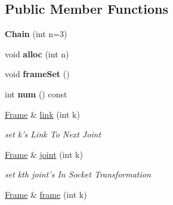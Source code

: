 \subsection*{Public Member Functions}
\begin{DoxyCompactItemize}
\item 
\hypertarget{classvsr_1_1_chain_a83b1b055fd89696f07791827a9e92c41}{{\bfseries Chain} (int n=3)}\label{classvsr_1_1_chain_a83b1b055fd89696f07791827a9e92c41}

\item 
\hypertarget{classvsr_1_1_chain_a8cbac59a79882160bb1833b0fcc94450}{void {\bfseries alloc} (int n)}\label{classvsr_1_1_chain_a8cbac59a79882160bb1833b0fcc94450}

\item 
\hypertarget{classvsr_1_1_chain_ae69e36757ff08da522827d105c0c51f4}{void {\bfseries frame\-Set} ()}\label{classvsr_1_1_chain_ae69e36757ff08da522827d105c0c51f4}

\item 
\hypertarget{classvsr_1_1_chain_a64334c0e24770356449744624e3b43ba}{int {\bfseries num} () const }\label{classvsr_1_1_chain_a64334c0e24770356449744624e3b43ba}

\item 
\hypertarget{classvsr_1_1_chain_ae2714bfd666058da1e4ce31be64efb02}{\hyperlink{classvsr_1_1_frame}{Frame} \& \hyperlink{classvsr_1_1_chain_ae2714bfd666058da1e4ce31be64efb02}{link} (int k)}\label{classvsr_1_1_chain_ae2714bfd666058da1e4ce31be64efb02}

\begin{DoxyCompactList}\small\item\em set k's Link To Next Joint \end{DoxyCompactList}\item 
\hypertarget{classvsr_1_1_chain_a2795a7540cdbc22f674deef0b94019d0}{\hyperlink{classvsr_1_1_frame}{Frame} \& \hyperlink{classvsr_1_1_chain_a2795a7540cdbc22f674deef0b94019d0}{joint} (int k)}\label{classvsr_1_1_chain_a2795a7540cdbc22f674deef0b94019d0}

\begin{DoxyCompactList}\small\item\em set kth joint's In Socket Transformation \end{DoxyCompactList}\item 
\hypertarget{classvsr_1_1_chain_ad76621b1eb14a0aed987593775606da4}{\hyperlink{classvsr_1_1_frame}{Frame} \& \hyperlink{classvsr_1_1_chain_ad76621b1eb14a0aed987593775606da4}{frame} (int k)}\label{classvsr_1_1_chain_ad76621b1eb14a0aed987593775606da4}


\end{DoxyCompactItemize}
